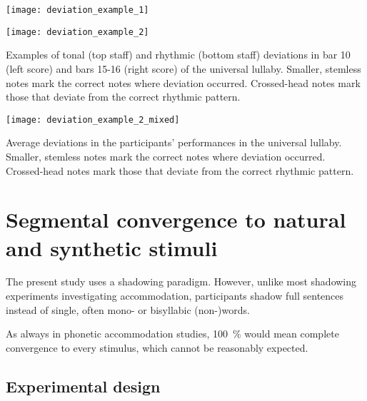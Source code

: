 \begin{snippet}[t]
	\begin{minipage}{.41\linewidth}
		\centering
		\texttt{[image: deviation\_example\_1]}
		\label{fig:deviation_example_1}
	\end{minipage}%
	\hfill
	\begin{minipage}{.49\linewidth}
		\centering
		\texttt{[image: deviation\_example\_2]}
		\label{fig:deviation_example_2}
	\end{minipage}%
	\caption[Examples of tonal and rhythmic deviations]
		{Examples of tonal (top staff) and rhythmic (bottom staff) deviations in bar 10 (left score) and bars 15-16 (right score) of the universal lullaby.
		Smaller, stemless notes mark the correct notes where deviation occurred.
		Crossed-head notes mark those that deviate from the correct rhythmic pattern.}
\end{snippet}

\begin{snippet}[t]
	\centering
	\texttt{[image: deviation\_example\_2\_mixed]}
	\caption[Average tonal and rhythmic deviations]
		{Average deviations in the participants' performances in the universal lullaby.
		Smaller, stemless notes mark the correct notes where deviation occurred.
		Crossed-head notes mark those that deviate from the correct rhythmic pattern.}
	\label{snippet:deviation_example}
\end{snippet}

\section{Segmental convergence to natural and synthetic stimuli}
\label{sec:convergence_to_natural_and_synthetic_stimuli}


The present study uses a shadowing paradigm. 
However, unlike most shadowing experiments  investigating accommodation, participants shadow full sentences instead of single, often mono- or bisyllabic (non-)words. 

As always in phonetic accommodation studies, \SI{100}{\percent} would mean complete convergence to every stimulus, which cannot be reasonably expected.

\subsection{Experimental design}
\label{subsec:design_HCIConv}


